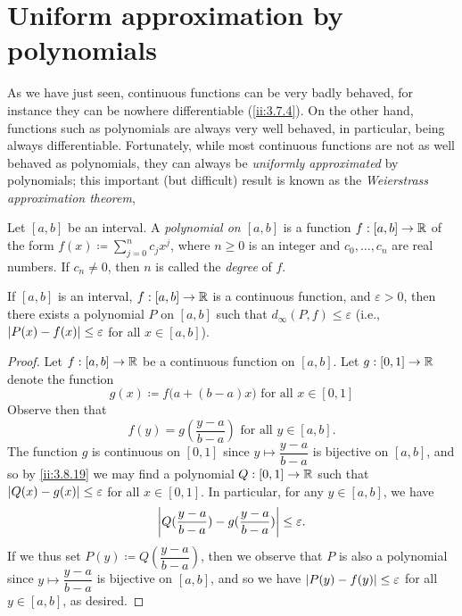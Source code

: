 \section{Uniform approximation by polynomials}\label{ii:sec:3.8}

\begin{note}
  As we have just seen, continuous functions can be very badly behaved, for instance they can be nowhere differentiable (\cref{ii:3.7.4}).
  On the other hand, functions such as polynomials are always very well behaved, in particular, being always differentiable.
  Fortunately, while most continuous functions are not as well behaved as polynomials, they can always be \emph{uniformly approximated} by polynomials; this important (but difficult) result is known as the \emph{Weierstrass approximation theorem},
\end{note}

\begin{defn}\label{ii:3.8.1}
  Let \([a, b]\) be an interval.
  A \emph{polynomial on \([a, b]\)} is a
  function \(f : [a, b] \to \mathbb{R}\) of the form \(f(x) \coloneqq \sum_{j = 0}^n c_j x^j\), where \(n \geq 0\) is an integer and \(c_0, \dots, c_n\) are real numbers.
  If \(c_n \neq 0\), then \(n\) is called the \emph{degree} of \(f\).
\end{defn}

\setcounter{thm}{2}
\begin{thm}\label{ii:3.8.3}
  If \([a, b]\) is an interval, \(f : [a, b] \to \mathbb{R}\) is a continuous function, and \(\varepsilon > 0\), then there exists a polynomial \(P\) on \([a, b]\) such that \(d_\infty(P, f) \leq \varepsilon\)
  (i.e., \(\left\lvert P(x) - f(x)\right\rvert \leq \varepsilon\) for all \(x \in [a, b]\)).
\end{thm}

\begin{proof}
  Let \(f : [a, b] \to \mathbb{R}\) be a continuous function on \([a, b]\).
  Let \(g : [0, 1] \to \mathbb{R}\) denote the function
  \[
    g(x) \coloneqq f\big(a + (b - a) x\big) \text{ for all } x \in [0, 1]
  \]
  Observe then that
  \[
    f(y) = g(\dfrac{y - a}{b - a}) \text{ for all } y \in [a, b].
  \]
  The function \(g\) is continuous on \([0, 1]\) since \(y \mapsto \dfrac{y - a}{b - a}\) is bijective on \([a, b]\), and so by \cref{ii:3.8.19} we may find a polynomial \(Q : [0, 1] \to \mathbb{R}\) such that \(\left\lvert Q(x) - g(x)\right\rvert \leq \varepsilon\) for all \(x \in [0, 1]\).
  In particular, for any \(y \in [a, b]\), we have
  \[
    \left\lvert Q(\dfrac{y - a}{b - a}) - g(\dfrac{y - a}{b - a})\right\rvert \leq \varepsilon.
  \]
  If we thus set \(P(y) \coloneqq Q(\dfrac{y - a}{b - a})\), then we observe that \(P\) is also a polynomial since \(y \mapsto \dfrac{y - a}{b - a}\) is bijective on \([a, b]\), and so we have \(\left\lvert P(y) - f(y)\right\rvert \leq \varepsilon\) for all \(y \in [a, b]\), as desired.
\end{proof}

